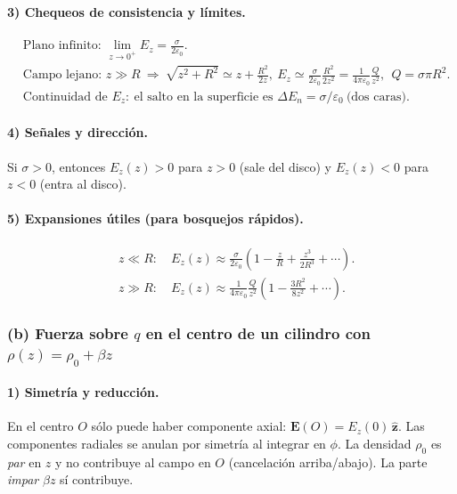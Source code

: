 \documentclass{article}
\begin{document}
\paragraph{3) Chequeos de consistencia y límites.}
\[
\begin{aligned}
&\text{Plano infinito: } \lim_{z\to 0^+}E_z=\frac{\sigma}{2\varepsilon_0}.\\
&\text{Campo lejano: } z\gg R\ \Rightarrow\ \sqrt{z^2+R^2}\simeq z+\frac{R^2}{2z},\
E_z\simeq \frac{\sigma}{2\varepsilon_0}\frac{R^2}{2z^2}
=\frac{1}{4\pi\varepsilon_0}\frac{Q}{z^2},\ \ Q=\sigma\pi R^2.\\
&\text{Continuidad de }E_z:\ \text{el salto en la superficie es } \Delta E_n=\sigma/\varepsilon_0\ \text{(dos caras).}
\end{aligned}
\]

\paragraph{4) Señales y dirección.}
Si $\sigma>0$, entonces $E_z(z)>0$ para $z>0$ (sale del disco) y $E_z(z)<0$ para $z<0$ (entra al disco).

\paragraph{5) Expansiones útiles (para bosquejos rápidos).}
\[
\begin{aligned}
&z\ll R:\quad E_z(z)\approx \frac{\sigma}{2\varepsilon_0}\left(1-\frac{z}{R}+\frac{z^3}{2R^3}+\cdots\right).\\
&z\gg R:\quad E_z(z)\approx \frac{1}{4\pi\varepsilon_0}\frac{Q}{z^2}\left(1-\frac{3R^2}{8z^2}+\cdots\right).
\end{aligned}
\]

\bigskip
\subsubsection*{(b) Fuerza sobre $q$ en el centro de un cilindro con $\rho(z)=\rho_0+\beta z$}

\paragraph{1) Simetría y reducción.}
En el centro $O$ sólo puede haber componente axial: $\mathbf E(O)=E_z(0)\,\hat{\mathbf z}$.  
Las componentes radiales se anulan por simetría al integrar en $\phi$. La densidad $\rho_0$ es \emph{par} en $z$ y no contribuye al campo en $O$ (cancelación arriba/abajo). La parte \emph{impar} $\beta z$ sí contribuye.
\end{document}
